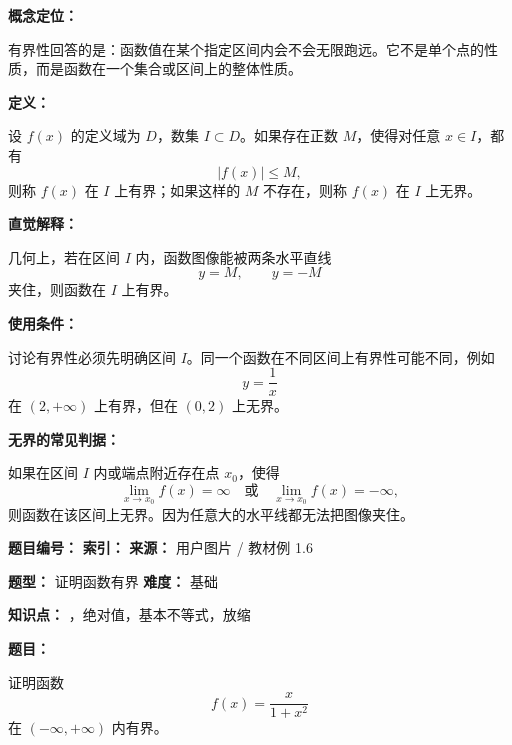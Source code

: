 \par

\begin{knowledgeBox}
\textbf{概念定位：}

有界性回答的是：函数值在某个指定区间内会不会无限跑远。它不是单个点的性质，而是函数在一个集合或区间上的整体性质。

\textbf{定义：}

设 \(f(x)\) 的定义域为 \(D\)，数集 \(I\subset D\)。如果存在正数 \(M\)，使得对任意 \(x\in I\)，都有
\[
|f(x)|\le M,
\]
则称 \(f(x)\) 在 \(I\) 上有界；如果这样的 \(M\) 不存在，则称 \(f(x)\) 在 \(I\) 上无界。

\textbf{直觉解释：}

几何上，若在区间 \(I\) 内，函数图像能被两条水平直线
\[
y=M,\qquad y=-M
\]
夹住，则函数在 \(I\) 上有界。

\textbf{使用条件：}

讨论有界性必须先明确区间 \(I\)。同一个函数在不同区间上有界性可能不同，例如
\[
y=\frac1x
\]
在 \((2,+\infty)\) 上有界，但在 \((0,2)\) 上无界。

\textbf{无界的常见判据：}

如果在区间 \(I\) 内或端点附近存在点 \(x_0\)，使得
\[
\lim_{x\to x_0}f(x)=\infty
\quad\text{或}\quad
\lim_{x\to x_0}f(x)=-\infty,
\]
则函数在该区间上无界。因为任意大的水平线都无法把图像夹住。
\end{knowledgeBox}

\begin{problemBox}
\begin{problemMeta}
\textbf{题目编号：}  \quad
\textbf{索引：}  \quad
\textbf{来源：} 用户图片 / 教材例 1.6

\textbf{题型：} 证明函数有界 \quad
\textbf{难度：} 基础

\textbf{知识点：} ，绝对值，基本不等式，放缩
\end{problemMeta}

\textbf{题目：}

证明函数
\[
f(x)=\frac{x}{1+x^2}
\]
在 \((-\infty,+\infty)\) 内有界。
\end{problemBox}


